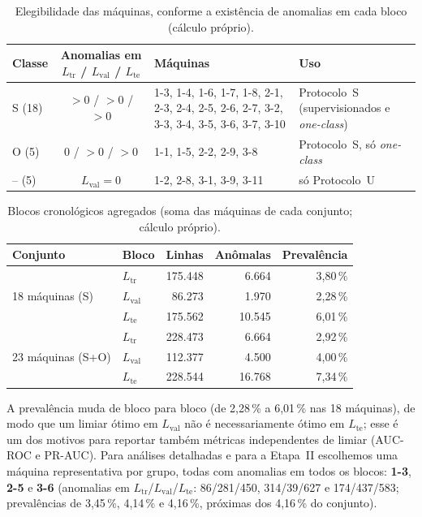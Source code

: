 \begin{table}[htbp]
\centering
\caption{Elegibilidade das máquinas, conforme a existência de anomalias em cada bloco (cálculo próprio).}
\label{tab:elegib}
\small
\begin{tabularx}{\textwidth}{@{}lcLL@{}}
\toprule
Classe & Anomalias em $L_{\mathrm{tr}}$ / $L_{\mathrm{val}}$ / $L_{\mathrm{te}}$ & Máquinas & Uso\\
\midrule
S (18) & $>0$ / $>0$ / $>0$ & 1-3, 1-4, 1-6, 1-7, 1-8, 2-1, 2-3, 2-4, 2-5, 2-6, 2-7, 3-2, 3-3, 3-4, 3-5, 3-6, 3-7, 3-10 & Protocolo~S (supervisionados e \emph{one-class})\\
O (5) & $0$ / $>0$ / $>0$ & 1-1, 1-5, 2-2, 2-9, 3-8 & Protocolo~S, só \emph{one-class}\\
-- (5) & $L_{\mathrm{val}}=0$ & 1-2, 2-8, 3-1, 3-9, 3-11 & só Protocolo~U\\
\bottomrule
\end{tabularx}
\end{table}

\begin{table}[htbp]
\centering
\caption{Blocos cronológicos agregados (soma das máquinas de cada conjunto; cálculo próprio).}
\label{tab:blocos}
\small
\begin{tabular}{llrrr}
\toprule
Conjunto & Bloco & Linhas & Anômalas & Prevalência\\
\midrule
\multirow{3}{*}{18 máquinas (S)} & $L_{\mathrm{tr}}$  & 175.448 & 6.664  & 3,80\,\%\\
                                 & $L_{\mathrm{val}}$ & 86.273  & 1.970  & 2,28\,\%\\
                                 & $L_{\mathrm{te}}$  & 175.562 & 10.545 & 6,01\,\%\\
\midrule
\multirow{3}{*}{23 máquinas (S+O)} & $L_{\mathrm{tr}}$  & 228.473 & 6.664  & 2,92\,\%\\
                                   & $L_{\mathrm{val}}$ & 112.377 & 4.500  & 4,00\,\%\\
                                   & $L_{\mathrm{te}}$  & 228.544 & 16.768 & 7,34\,\%\\
\bottomrule
\end{tabular}
\end{table}

A prevalência muda de bloco para bloco (de 2,28\,\% a 6,01\,\% nas 18 máquinas), de modo que um limiar ótimo em
$L_{\mathrm{val}}$ não é necessariamente ótimo em $L_{\mathrm{te}}$; esse é um dos motivos para reportar também
métricas independentes de limiar (AUC-ROC e PR-AUC). Para análises detalhadas e para a Etapa~II escolhemos uma
máquina representativa por grupo, todas com anomalias em todos os blocos: \textbf{1-3}, \textbf{2-5} e \textbf{3-6}
(anomalias em $L_{\mathrm{tr}}$/$L_{\mathrm{val}}$/$L_{\mathrm{te}}$: 86/281/450, 314/39/627 e 174/437/583;
prevalências de 3,45\,\%, 4,14\,\% e 4,16\,\%, próximas dos 4,16\,\% do conjunto).

